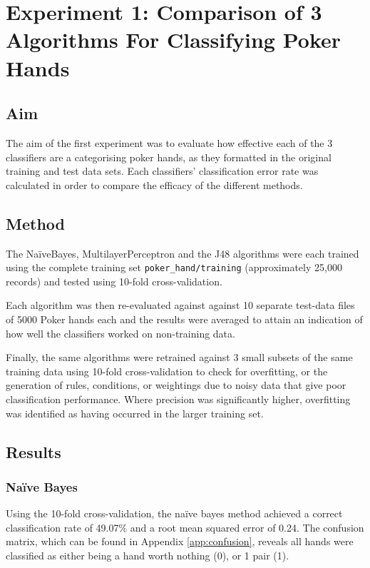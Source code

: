 \documentclass[10pt, a4paper]{article}
\begin{document}
\section*{Experiment 1: Comparison of 3 Algorithms For Classifying Poker Hands}

\subsection*{Aim}

The aim of the first experiment was to evaluate how effective each of the 3 classifiers are a categorising poker hands, as they formatted in the original training and test data sets. Each classifiers' classification error rate was calculated in order to compare the efficacy of the different methods.

\subsection*{Method}

The Na\"iveBayes, MultilayerPerceptron and the J48 algorithms were each trained using the complete training set \texttt{poker\_hand/training} (approximately 25,000 records) and tested using 10-fold cross-validation.

Each algorithm was then re-evaluated against against 10 separate test-data files of 5000 Poker hands each and the results were averaged to attain an indication of how well the classifiers worked on non-training data.

Finally, the same algorithms were retrained against 3 small subsets of the same training data using 10-fold cross-validation to check for overfitting, or the generation of rules, conditions, or weightings due to noisy data that give poor classification performance. Where precision was significantly higher, overfitting was identified as having occurred in the larger training set.

\subsection*{Results}

\subsubsection*{Na\"ive Bayes}

Using the 10-fold cross-validation, the na\"ive bayes method achieved a correct classification rate of 49.07\% and a root mean squared error of 0.24. The confusion matrix, which can be found in  Appendix \ref{app:confusion}, reveals all hands were classified as either being a hand worth nothing (0), or 1 pair (1). 
\end{document}
